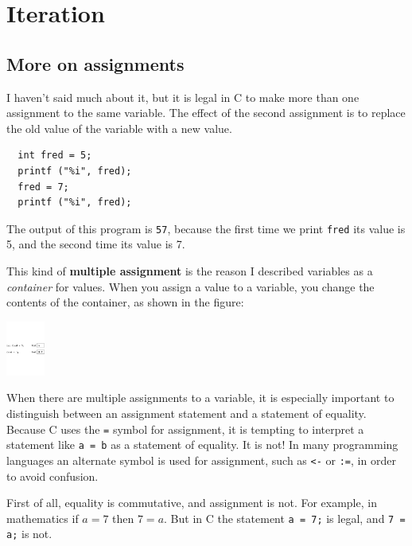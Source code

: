 
\chapter{Iteration}

\section{More on assignments }
I haven't said much about it, but it is legal in C to
make more than one assignment to the same variable.  The
effect of the second assignment is to replace the old value
of the variable with a new value.

\begin{verbatim}
  int fred = 5;
  printf ("%i", fred);
  fred = 7;
  printf ("%i", fred);
\end{verbatim}
%
The output of this program is {\tt 57}, because the first
time we print {\tt fred} its value is 5, and the second time
its value is 7.

This kind of {\bf multiple assignment} is the reason I
described variables as a {\em container} for values.  When
you assign a value to a variable, you change the contents of
the container, as shown in the figure:

\vspace{0.1in}
\centerline{\includegraphics[height=1.8cm]{figs/assign2.pdf}}
\vspace{0.1in}

When there are multiple assignments to a variable, it is especially
important to distinguish between an assignment statement and a
statement of equality.  Because C uses the {\tt =} symbol for
assignment, it is tempting to interpret a statement like {\tt a = b}
as a statement of equality.  It is not! In many programming languages 
an alternate symbol is used
for assignment, such as {\tt <-} or {\tt :=}, in order to
avoid confusion.

First of all, equality is commutative, and assignment is not.
For example, in mathematics if $a = 7$ then $7 = a$.  But in
C the statement {\tt a = 7;} is legal, and {\tt 7 = a;}
is not.

